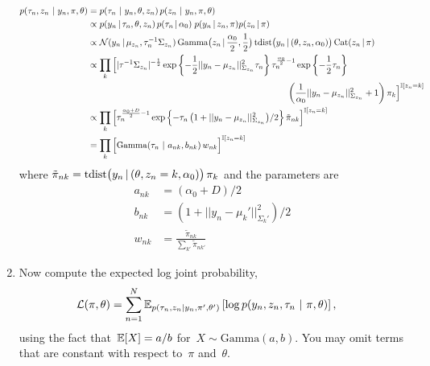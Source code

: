\begin{enumerate}[label=(\alph*)]
\begin{solution}
\begin{align*}
    p(\tau_n, z_n \mid y_n, \pi, \theta)
        &= p(\tau_n \mid y_n, \theta, z_n) \, p(z_n \mid y_n, \pi, \theta) \\
        &\propto p(y_n \given \tau_n, \theta,z_n) \, p(\tau_n\given\alpha_0) \;
            p(y_n \given z_n, \pi) p(z_n \given \pi) \\
        &\propto \mathcal{N}(y_n \given \mu_{z_n}, \tau_n^{-1} \Sigma_{z_n})\, 
            \textrm{Gamma}\big(z_n \given\frac{\alpha_0}{2}, \frac{1}{2}\big)\,
            \mathrm{tdist}\big(y_n\given(\theta, z_n, \alpha_0)\big) \, 
            \textrm{Cat}(z_n \given \pi) \\
        &\propto \prod_k \Big[
                |\tau^{-1}\Sigma_{z_n}|^{-\frac{1}{2}}
                \expp{-\frac{1}{2}||y_n-\mu_{z_n}||^2_{\Sigma_{z_n}} \tau_n}
                \tau_n^{\frac{\alpha_0}{2}-1} \expp{-\frac{1}{2}\tau_n} \\
        &\hspace{225pt}
                \left(\frac{1}{\alpha_0}||y_n-\mu_{z_n}||^2_{\Sigma_{z_n}} + 1\right)
                \pi_k
            \Big]^{\bbI[z_n = k]}\\
        &\propto \prod_k \Big[
            \tau_n^{\frac{\alpha_0 + D}{2} - 1}
            \expp{-\tau_n\,\big(1+||y_n-\mu_{z_n}||^2_{\Sigma_{z_n}}\big)/2}
            \tilde{\pi}_{nk}
            \Big]^{\bbI[z_n = k]}\\
        &= \prod_k \Big[
                \mathrm{Gamma}(\tau_n \mid a_{nk}, b_{nk}) \, w_{nk}
            \Big]^{\bbI[z_n = k]}
\end{align*}
where
$\tilde{\pi}_{nk}
    = \mathrm{tdist}\big(y_n\,|\,(\theta,z_n=k,\alpha_0)\big)\,\pi_k$
and the parameters are
\begin{align*}
    a_{nk}  &= (\alpha_0 + D)/2
    \\
    b_{nk}  &= (1+||y_n-\mu_{k}'||^2_{\Sigma_{k}'})/2
    \\
    w_{nk}  &= \frac{\tilde{\pi}_{nk}}
                    {\textstyle\sum_{k'} \tilde{\pi}_{nk'}}
\end{align*}
\end{solution}

\clearpage

\item Now compute the expected log joint probability,
\begin{align*}
    \mathcal{L}(\pi, \theta) &= \sum_{n=1}^N \mathbb{E}_{p(\tau_n, z_n | y_n, \pi', \theta')} \left[ \log p(y_n, z_n, \tau_n ~\vert~ \pi, \theta) \right],
\end{align*}
using the fact that~$\mathbb{E}[X] = a/b$ for~$X \sim \mathrm{Gamma}(a, b)$.  You may omit terms that are constant with respect to~$\pi$ and~$\theta$.


\end{enumerate}
